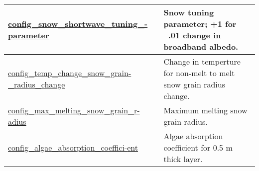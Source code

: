 {\begin{center}
\begin{longtable}{| p{2.0in} || p{4.0in} |}
    \hline
    \hyperref[subsec:nm_sec_config_snow_shortwave_tuning_parameter]{config\_snow\_shortwave\_tuning\_-}\hyperref[subsec:nm_sec_config_snow_shortwave_tuning_parameter]{parameter}& Snow tuning parameter; +1 for ~.01 change in broadband albedo. \\
    \hline
    \hyperref[subsec:nm_sec_config_temp_change_snow_grain_radius_change]{config\_temp\_change\_snow\_grain-}\hyperref[subsec:nm_sec_config_temp_change_snow_grain_radius_change]{\_radius\_change}& Change in temperture for non-melt to melt snow grain radius change. \\
    \hline
    \hyperref[subsec:nm_sec_config_max_melting_snow_grain_radius]{config\_max\_melting\_snow\_grain\_r-}\hyperref[subsec:nm_sec_config_max_melting_snow_grain_radius]{adius}& Maximum melting snow grain radius. \\
    \hline
    \hyperref[subsec:nm_sec_config_algae_absorption_coefficient]{config\_algae\_absorption\_coeffici-}\hyperref[subsec:nm_sec_config_algae_absorption_coefficient]{ent}& Algae absorption coefficient for 0.5 m thick layer. \\
    \hline
\end{longtable}
\end{center}
}
